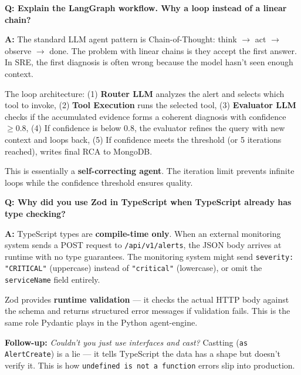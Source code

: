 \documentclass[11pt,a4paper]{article}
\begin{document}
\begin{interviewbox}
\textbf{Q: Explain the LangGraph workflow. Why a loop instead of a linear chain?}

\textbf{A:} The standard LLM agent pattern is Chain-of-Thought: think $\rightarrow$ act $\rightarrow$ observe $\rightarrow$
done. The problem with linear chains is they accept the first answer. In SRE, the first
diagnosis is often wrong because the model hasn't seen enough context.

The loop architecture: (1) \textbf{Router LLM} analyzes the alert and selects which tool to invoke, (2) \textbf{Tool Execution} runs the selected tool, (3) \textbf{Evaluator LLM} checks if the accumulated evidence forms a coherent diagnosis with confidence $\geq 0.8$, (4) If confidence is below 0.8, the evaluator refines the query with new context and loops back, (5) If confidence meets the threshold (or 5 iterations reached), writes final RCA to MongoDB.

This is essentially a \textbf{self-correcting agent}. The iteration limit prevents infinite
loops while the confidence threshold ensures quality.
\end{interviewbox}

\begin{interviewbox}
\textbf{Q: Why did you use Zod in TypeScript when TypeScript already has type checking?}

\textbf{A:} TypeScript types are \textbf{compile-time only}. When an external monitoring system
sends a POST request to \texttt{/api/v1/alerts}, the JSON body arrives at runtime with no
type guarantees. The monitoring system might send \texttt{severity: "CRITICAL"} (uppercase)
instead of \texttt{"critical"} (lowercase), or omit the \texttt{serviceName} field entirely.

Zod provides \textbf{runtime validation} — it checks the actual HTTP body against the
schema and returns structured error messages if validation fails. This is the same role
Pydantic plays in the Python agent-engine.

\textbf{Follow-up:} \textit{Couldn't you just use interfaces and cast?} Castting (\texttt{as AlertCreate})
is a lie — it tells TypeScript the data has a shape but doesn't verify it. This is how
\texttt{undefined is not a function} errors slip into production.
\end{interviewbox}
\end{document}
